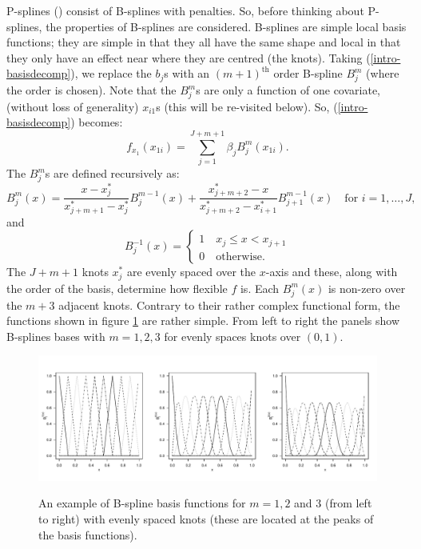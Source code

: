 P-splines (\cite{eilersmarx96}) consist of B-splines with penalties. So, before thinking about P-splines, the properties of B-splines are considered. B-splines are simple local basis functions; they are simple in that they all have the same shape and local in that they only have an effect near where they are centred (the knots). Taking (\ref{intro-basisdecomp}), we replace the $b_j$s with an $(m+1)^\text{th}$ order B-spline $B_j^m$ (where the order is chosen). Note that the $B_j^m$s are only a function of one covariate, (without loss of generality) $x_{i1}$s (this will be re-visited below). So, (\ref{intro-basisdecomp}) becomes:
\begin{equation*}
f_{x_1}(x_{1i}) = \sum_{j=1}^{J+m+1} \beta_j B^m_j(x_{1i}).
\end{equation*}
The $B_j^m$s are defined recursively as:
\begin{equation*}
B_j^m(x) = \frac{x-x^*_j}{x^*_{j+m+1} - x^*_j} B_j^{m-1}(x) + \frac{x^*_{j+m+2} -x}{x^*_{j+m+2} - x^*_{i+1}} B_{j+1}^{m-1}(x) \quad \text{for } i=1,\ldots,J,
\end{equation*}
and
\begin{equation*}
 B_j^{-1}(x)=\begin{cases}
1 \quad x_j \leq x < x_{j+1}\\
0 \quad \text{otherwise}. 
\end{cases}
\end{equation*}
The $J+m+1$ knots $x^*_j$ are evenly spaced over the $x$-axis and these, along with the order of the basis, determine how flexible $f$ is. Each $B^m_j(x)$ is non-zero over the $m+3$ adjacent knots. Contrary to their rather complex functional form, the functions shown in figure \ref{bs-basis} are rather simple. From left to right the panels show B-splines bases with $m=1,2,3$ for evenly spaces knots over $(0,1)$.

\begin{figure}[tb]
\centering
\includegraphics[width=6in]{intro/figs/bspline-ex.pdf}\\
\caption{An example of B-spline basis functions for $m=1, 2$ and $3$ (from left to right) with evenly spaced knots (these are located at the peaks of the basis functions).}
\label{bs-basis}
\end{figure}

